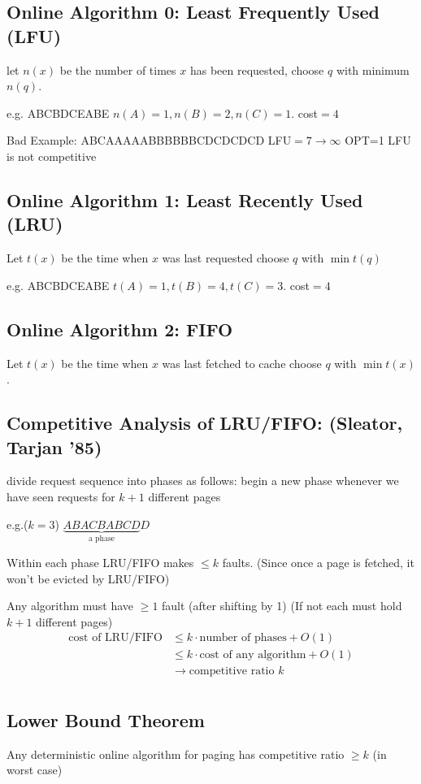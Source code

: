 \documentclass[english,12pt]{article}
\theoremstyle{plain}
\theoremstyle{definition}
\theoremstyle{definition} %
\begin{document}
\subsection{Online Algorithm 0:  Least Frequently Used (LFU)}
let $n(x)$ be the number of times $x$ has been requested, choose $q$ with minimum $n(q)$.

e.g. ABCBDCEABE
$n(A)=1, n(B)=2, n(C)=1$.
cost$=4$

Bad Example:
ABCAAAAABBBBBBCDCDCDCD
LFU$=7\to\infty$
OPT=1
LFU is not competitive

\subsection{Online Algorithm 1: Least Recently Used (LRU)}
Let $t(x)$ be the time when $x$ was last requested choose $q$ with $\min t(q)$

e.g. ABCBDCEABE
$t(A)=1, t(B)=4, t(C)=3$.
cost$=4$

\subsection{Online Algorithm 2: FIFO}
Let $t(x)$ be the time when $x$ was last fetched to cache choose $q$ with $\min t(x)$.                       

\subsection{Competitive Analysis of LRU/FIFO: (Sleator, Tarjan '85)}
divide request sequence into phases as follows:
begin a new phase whenever we have seen requests for $k+1$ different pages

e.g.($k=3$)
$\underbrace{ABACBABCD}_{\text{a phase}}D$

Within each phase LRU/FIFO makes $\le k$ faults.  (Since once a page is fetched, it won't be evicted by LRU/FIFO)

Any algorithm must have $\ge1$ fault (after shifting by 1)
(If not each must hold $k+1$ different pages)
\begin{align*}
\text{cost of LRU/FIFO} &\le k \cdot\text{number of phases} + O(1)\\
&\le k \cdot\text{cost of any algorithm} + O(1)\\
&\rightarrow\text{competitive ratio } k\\
\end{align*}

\subsection{Lower Bound Theorem} 
Any deterministic online algorithm for paging has competitive ratio $\ge k$ (in worst case)
\end{document}
